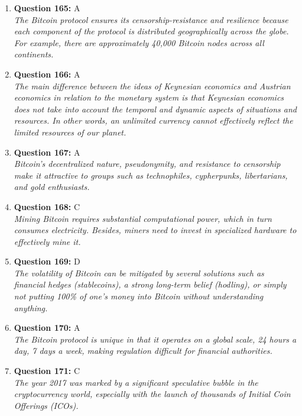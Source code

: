 \documentclass[12pt,a4paper]{article}
\begin{document}
\begin{enumerate}
\item \textbf{Question 165:} A
\\ \textit{The Bitcoin protocol ensures its censorship-resistance and resilience because each component of the protocol is distributed geographically across the globe. For example, there are approximately 40,000 Bitcoin nodes across all continents.}

\item \textbf{Question 166:} A
\\ \textit{The main difference between the ideas of Keynesian economics and Austrian economics in relation to the monetary system is that Keynesian economics does not take into account the temporal and dynamic aspects of situations and resources. In other words, an unlimited currency cannot effectively reflect the limited resources of our planet.}

\item \textbf{Question 167:} A
\\ \textit{Bitcoin's decentralized nature, pseudonymity, and resistance to censorship make it attractive to groups such as technophiles, cypherpunks, libertarians, and gold enthusiasts.}

\item \textbf{Question 168:} C
\\ \textit{Mining Bitcoin requires substantial computational power, which in turn consumes electricity. Besides, miners need to invest in specialized hardware to effectively mine it.}

\item \textbf{Question 169:} D
\\ \textit{The volatility of Bitcoin can be mitigated by several solutions such as financial hedges (stablecoins), a strong long-term belief (hodling), or simply not putting 100\% of one's money into Bitcoin without understanding anything.}

\item \textbf{Question 170:} A
\\ \textit{The Bitcoin protocol is unique in that it operates on a global scale, 24 hours a day, 7 days a week, making regulation difficult for financial authorities.}

\item \textbf{Question 171:} C
\\ \textit{The year 2017 was marked by a significant speculative bubble in the cryptocurrency world, especially with the launch of thousands of Initial Coin Offerings (ICOs).}


\end{enumerate}
\end{document}
